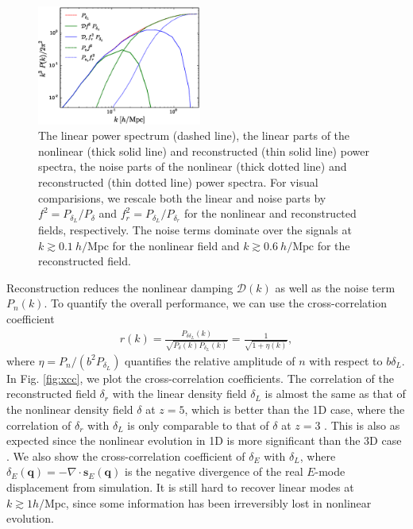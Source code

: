 \documentclass[aps,prl,twocolumn,showpacs,superscriptaddress,groupedaddress,nofootinbib]{revtex4}  %
\newcommand{\mr}{\mathrm}
\newcommand{\mc}{\mathcal}
\newcommand{\bea}{\begin{eqnarray}}
\newcommand{\eea}{\end{eqnarray}}
\begin{document}
\begin{figure}[tbp]
\begin{center}
\includegraphics[width=0.48\textwidth]{f2.eps}
\end{center}
\vspace{-0.7cm}
\caption{The linear power spectrum (dashed line), the linear parts of the
nonlinear (thick solid line) and reconstructed (thin solid line) power spectra,
the noise parts of the nonlinear (thick dotted line) and reconstructed
(thin dotted line) power spectra.
For visual comparisions, we rescale both the linear and noise parts by
$f^2=P_{\delta_L}/P_{\delta}$ and $f^2_r=P_{\delta_L}/P_{\delta_r}$ for the nonlinear and reconstructed fields, respectively.
The noise terms dominate over the signals at
$k\gtrsim0.1\ h/\mr{Mpc}$ for the nonlinear field and $k\gtrsim0.6\ h/\mr{Mpc}$
for the reconstructed field.}
\label{fig:ps}
\end{figure}

Reconstruction reduces the nonlinear damping $\mc{D}(k)$ as well as the
noise term $P_{n}(k)$. To quantify the overall performance, we can use the
cross-correlation coefficient
\bea
r(k)=\frac{P_{\delta\delta_L}(k)}
{\sqrt{P_{\delta}(k)P_{\delta_L}(k)}}
=\frac{1}{\sqrt{1+\eta(k)}},
\eea
where $\eta=P_n/(b^2P_{\delta_L})$ quantifies the relative amplitude
of $n$ with respect to $b\delta_L$. 
In Fig. \ref{fig:xcc}, we plot the cross-correlation coefficients.
The correlation of the reconstructed field $\delta_r$ with the linear density
field $\delta_L$ is almost the same as that of the nonlinear density field 
$\delta$ at $z=5$, which is better than the 1D case, where the correlation of
$\delta_r$ with $\delta_L$ is only comparable to that of $\delta$ 
at $z=3$ \cite{2016arXiv160907041Z}.
This is also as expected since the nonlinear evolution in 1D is more
significant than the 3D case \cite{2016matt}.
We also show the cross-correlation coefficient of $\delta_E$ with $\delta_L$,
where $\delta_E(\bm{q})=-\nabla\cdot \bm{s}_E(\bm{q})$ is the negative 
divergence of the real $E$-mode displacement from simulation.
It is still hard to recover linear modes at $k\gtrsim1h/\mr{Mpc}$, since some information has been irreversibly lost in nonlinear evolution. 
\end{document}
